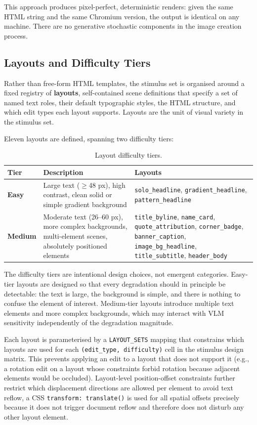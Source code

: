 This approach produces pixel-perfect, deterministic renders: given the same HTML string and the same Chromium version, the output is identical on any machine. There are no generative stochastic components in the image creation process.

\subsection{Layouts and Difficulty Tiers} \label{Layouts and Difficulty Tiers}

Rather than free-form HTML templates, the stimulus set is organised around a fixed registry of \textbf{layouts}, self-contained scene definitions that specify a set of named text roles, their default typographic styles, the HTML structure, and which edit types each layout supports. Layouts are the unit of visual variety in the stimulus set.

Eleven layouts are defined, spanning two difficulty tiers:

\begin{table}[htbp]
\centering
\caption{Layout difficulty tiers.}
\label{tab:layout-tiers}
\begin{tabular}{lp{5cm}p{6cm}}
\toprule
Tier & Description & Layouts \\
\midrule
\textbf{Easy} & Large text ($\geq$48 px), high contrast, clean solid or simple gradient background & \texttt{solo\_headline}, \texttt{gradient\_headline}, \texttt{pattern\_headline} \\
\midrule
\textbf{Medium} & Moderate text (26--60 px), more complex backgrounds, multi-element scenes, absolutely positioned elements & \texttt{title\_byline}, \texttt{name\_card}, \texttt{quote\_attribution}, \texttt{corner\_badge}, \texttt{banner\_caption}, \texttt{image\_bg\_headline}, \texttt{title\_subtitle}, \texttt{header\_body} \\
\bottomrule
\end{tabular}
\end{table}

The difficulty tiers are intentional design choices, not emergent categories. Easy-tier layouts are designed so that every degradation should in principle be detectable: the text is large, the background is simple, and there is nothing to confuse the element of interest. Medium-tier layouts introduce multiple text elements and more complex backgrounds, which may interact with VLM sensitivity independently of the degradation magnitude.

Each layout is parameterised by a \texttt{LAYOUT\_SETS} mapping that constrains which layouts are used for each \texttt{(edit\_type, difficulty)} cell in the stimulus design matrix. This prevents applying an edit to a layout that does not support it (e.g., a rotation edit on a layout whose constraints forbid rotation because adjacent elements would be occluded). Layout-level position-offset constraints further restrict which displacement directions are allowed per element to avoid text reflow, a CSS \texttt{transform: translate()} is used for all spatial offsets precisely because it does not trigger document reflow and therefore does not disturb any other layout element.

